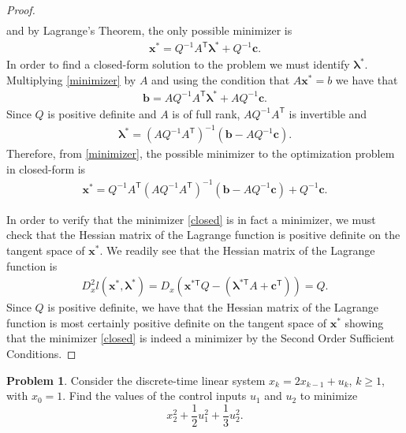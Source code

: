 \documentclass[12pt]{article}
\theoremstyle{definition}
\newtheorem{problem}{Problem}
\newcommand{\vc}[1]{\boldsymbol{#1}}
\newcommand{\tran}{\mathsf{T}}
\begin{document}
\begin{proof}
\begin{align*}
  \end{align*}
  and by Lagrange's Theorem, the only possible minimizer is
  \begin{align}\label{minimizer}
    \vc{x}^{*} = Q^{-1}A^\tran \vc{\lambda}^{*} + Q^{-1}\vc{c}.
  \end{align}
  In order to find a closed-form solution to the problem we must identify $\vc{\lambda}^{*}$. Multiplying
  \eqref{minimizer} by $A$ and using the condition that $A\vc{x}^{*} = b$ we have that
  \begin{align*}
    \vc{b} = AQ^{-1}A^\tran \vc{\lambda}^{*} + AQ^{-1}\vc{c}.
  \end{align*}
  Since $Q$ is positive definite and $A$ is of full rank, $AQ^{-1}A^\tran$ is invertible and
  \begin{align*}
    \vc{\lambda}^{*} = (AQ^{-1}A^\tran)^{-1}(\vc{b} - AQ^{-1}\vc{c}).
  \end{align*}
  Therefore, from \eqref{minimizer}, the possible minimizer to the optimization problem in closed-form is
  \begin{align}\label{closed}
    \vc{x}^{*} = Q^{-1}A^\tran(AQ^{-1}A^\tran)^{-1}(\vc{b} - AQ^{-1}\vc{c}) + Q^{-1}\vc{c}.
  \end{align}

  In order to verify that the minimizer \eqref{closed} is in fact a minimizer,
  we must check that the Hessian matrix of the Lagrange function is positive definite on the tangent space of $\vc{x}^{*}$.
  We readily see that the Hessian matrix of the Lagrange function is
  \begin{align*}
    D^2_x l(\vc{x}^{*}, \vc{\lambda}^{*}) = D_x(\vc{x}^{*\tran} Q - \left(\vc{\lambda}^{*\tran} A + \vc{c}^\tran\right)) = Q.
  \end{align*}
  Since $Q$ is positive definite, we have that the Hessian matrix of the Lagrange function is most certainly
  positive definite on the tangent space of $\vc{x}^{*}$ showing that the minimizer \eqref{closed} is indeed a minimizer by the Second Order Sufficient Conditions.
\end{proof}
\newpage


\begin{problem}
  Consider the discrete-time linear system $x_k = 2 x_{k-1} + u_k$, $k \geq 1$, with
  $x_0 = 1$. Find the values of the control inputs $u_1$ and $u_2$ to minimize
  $$x_2^2 + \frac{1}{2}u_1^2+ \frac{1}{3}u_2^2.$$
\end{problem}
\end{document}
